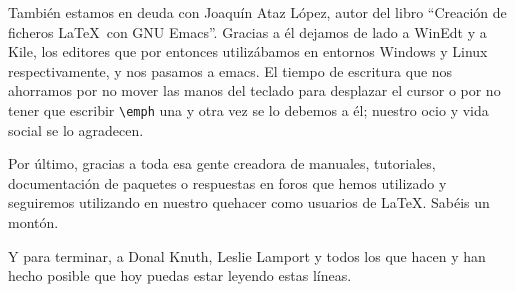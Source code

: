 También estamos en deuda con Joaquín Ataz López, autor del libro
``Creación de ficheros \LaTeX\ con {GNU} Emacs''. Gracias a él dejamos
de lado a WinEdt y a Kile, los editores que por entonces utilizábamos
en entornos Windows y Linux respectivamente, y nos pasamos a emacs. El
tiempo de escritura que nos ahorramos por no mover las manos del
teclado para desplazar el cursor o por no tener que escribir
\verb+\emph+ una y otra vez se lo debemos a él; nuestro ocio y vida
social se lo agradecen.

Por último, gracias a toda esa gente creadora de manuales, tutoriales,
documentación de paquetes o respuestas en foros que hemos utilizado y
seguiremos utilizando en nuestro quehacer como usuarios de
\LaTeX. Sabéis un montón.

Y para terminar, a Donal Knuth, Leslie Lamport y todos los que hacen y
han hecho posible que hoy puedas estar leyendo estas líneas.

\endinput
